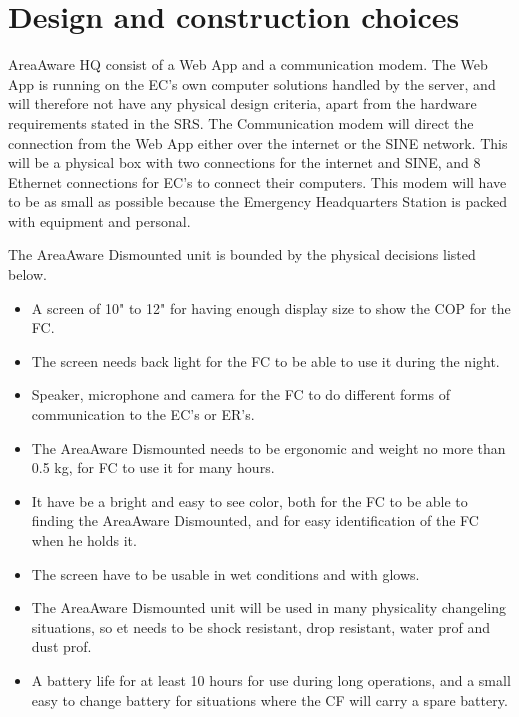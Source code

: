 \section{Design and construction choices}
AreaAware HQ consist of a Web App and a communication modem. The Web App is running on the EC's own computer solutions handled by the server, and will therefore not have any physical design criteria, apart from the hardware requirements stated in the SRS. The Communication modem will direct the connection from the Web App either over the internet or the SINE network. This will be a physical box with two connections for the internet and SINE, and 8 Ethernet connections for EC's to connect their computers. This modem will have to be as small as possible because the Emergency Headquarters Station is packed with equipment and personal.

The AreaAware Dismounted unit is bounded by the physical decisions listed below.

\begin{itemize}
  \item A screen of 10" to 12" for having enough display size to show the COP for the FC.
  \item The screen needs back light for the FC to be able to use it during the night.
  \item Speaker, microphone and camera for the FC to do different forms of communication to the EC's or ER's.
  \item The AreaAware Dismounted needs to be ergonomic and weight no more than 0.5 kg, for FC to use it for many hours.
  \item It have be a bright and easy to see color, both for the FC to be able to finding the AreaAware Dismounted, and for easy identification of the FC when he holds it.
  \item The screen have to be usable in wet conditions and with glows.
  \item The AreaAware Dismounted unit will be used in many physicality changeling situations, so et needs to be shock resistant, drop resistant, water prof and dust prof.
  \item A battery life for at least 10 hours for use during long operations, and a small easy to change battery for situations where the CF will carry a spare battery.
\end{itemize}